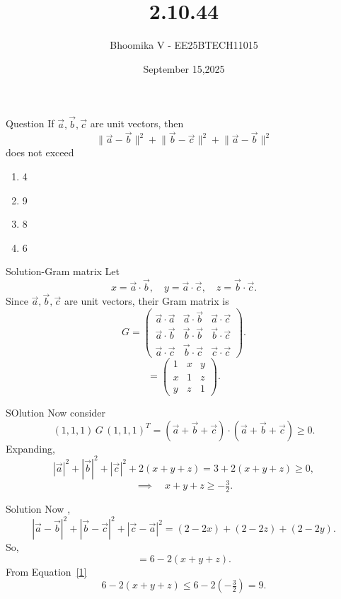 \documentclass{beamer}
\begin{document}
\title 
{2.10.44}
\date{September 15,2025}


\author 
{Bhoomika V - EE25BTECH11015}




\frame{\titlepage}
\begin{frame}{Question}
If $\vec{a}, \vec{b}, \vec{c}$ are unit vectors, then
\[
\lVert \vec{a} - \vec{b} \rVert^2
+ \lVert \vec{b} - \vec{c} \rVert^2
+ \lVert \vec{a} - \vec{b} \rVert^2
\]
does not exceed
\begin{enumerate}[label=\alph*)] %
    \item 4
    \item 9
    \item 8
    \item 6
\end{enumerate}
\end{frame}

\begin{frame}{Solution-Gram matrix}
Let 
\[
x = \vec{a}\cdot \vec{b}, \quad y = \vec{a}\cdot \vec{c}, \quad z = \vec{b}\cdot \vec{c}.
\]
Since $\vec{a},\vec{b},\vec{c}$ are unit vectors, their Gram matrix is
\[
G = \begin{pmatrix}
\vec{a}\cdot \vec{a} & \vec{a}\cdot \vec{b} & \vec{a}\cdot \vec{c} \\
\vec{a}\cdot \vec{b} & \vec{b}\cdot \vec{b} & \vec{b}\cdot \vec{c} \\
\vec{a}\cdot \vec{c} & \vec{b}\cdot \vec{c} & \vec{c}\cdot \vec{c}
\end{pmatrix}. 
\]
\[
 = \begin{pmatrix}
1 & x & y \\
x & 1 & z \\
y & z & 1
\end{pmatrix}.
\]
\end{frame}

\begin{frame}{SOlution}
Now consider
\[
(1,1,1) \, G \, (1,1,1)^T = (\vec{a}+\vec{b}+\vec{c}) \cdot (\vec{a}+\vec{b}+\vec{c}) \geq 0.
\]
Expanding,
\[
|\vec{a}|^2 + |\vec{b}|^2 + |\vec{c}|^2 + 2(x+y+z) = 3 + 2(x+y+z) \geq 0,
\]
\begin{equation}
\implies \quad x+y+z \geq -\tfrac{3}{2}.
\label{1}
\end{equation}
\end{frame}

\begin{frame}{Solution}
Now ,
\[
|\vec{a}-\vec{b}|^2 + |\vec{b}-\vec{c}|^2 + |\vec{c}-\vec{a}|^2
= (2-2x) + (2-2z) + (2-2y).
\]
So,
\[
= 6 - 2(x+y+z).
\]
From Equation~\eqref{1}
\[
6 - 2(x+y+z) \leq 6 - 2\left(-\tfrac{3}{2}\right) = 9.
\]

\end{frame}
\end{document}
